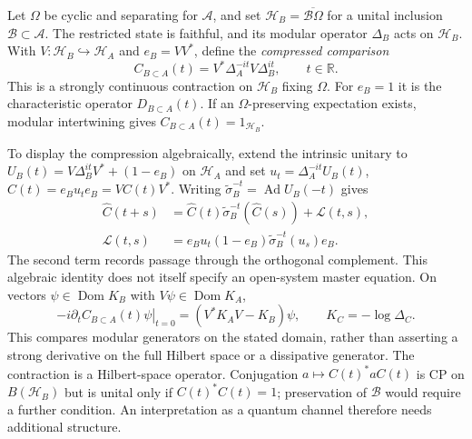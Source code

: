 \documentclass[a4paper,11pt]{article}
\theoremstyle{definition}
\newcommand{\nn}{\nonumber}
\begin{document}
Let $\Omega$ be cyclic and separating for $\mathcal A$, and set
$\mathcal H_B=\overline{\mathcal B\Omega}$ for a unital inclusion $\mathcal B\subset\mathcal A$.
The restricted state is faithful, and its modular operator $\Delta_B$ acts on
$\mathcal H_B$. With $V:\mathcal H_B\hookrightarrow\mathcal H_A$ and $e_B=VV^*$,
define the {\it compressed comparison}
\begin{equation}
 C_{B\subset A}(t)=V^*\Delta_A^{-it}V\Delta_B^{it},
 \qquad t\in\mathbb R.
\end{equation}
This is a strongly continuous contraction on $\mathcal H_B$ fixing $\Omega$.
For $e_B=1$ it is the characteristic operator $D_{B\subset A}(t)$.
If an $\Omega$-preserving expectation exists, modular intertwining gives
$C_{B\subset A}(t)=1_{\mathcal H_B}$.

To display the compression algebraically, extend the intrinsic unitary to
$U_B(t)=V\Delta_B^{it}V^*+(1-e_B)$ on $\mathcal H_A$ and set
$u_t=\Delta_A^{-it}U_B(t)$, $\widehat C(t)=e_Bu_te_B=VC(t)V^*$.
Writing $\widetilde\sigma_B^{-t}=\operatorname{Ad}U_B(-t)$ gives
\begin{align}
 \widehat C(t+s)&=\widehat C(t)\widetilde\sigma_B^{-t}(\widehat C(s))
                  +\mathcal L(t,s),\nn\\
 \mathcal L(t,s)&=e_Bu_t(1-e_B)\widetilde\sigma_B^{-t}(u_s)e_B.
\end{align}
The second term records passage through the orthogonal complement. This algebraic
identity does not itself specify an open-system master equation.
On vectors $\psi\in\operatorname{Dom}K_B$ with $V\psi\in\operatorname{Dom}K_A$,
\begin{equation}
 -i\left.\partial_t C_{B\subset A}(t)\psi\right|_{t=0}
 =(V^*K_AV-K_B)\psi,\qquad K_C=-\log\Delta_C.
\end{equation}
This compares modular generators on the stated domain, rather than asserting
a strong derivative on the full Hilbert space or a dissipative generator.
The contraction is a Hilbert-space operator. Conjugation
$a\mapsto C(t)^*aC(t)$ is CP on $B(\mathcal H_B)$ but is unital only if
$C(t)^*C(t)=1$; preservation of $\mathcal B$ would require a further condition.
An interpretation as a quantum channel therefore needs additional structure.



\end{document}
